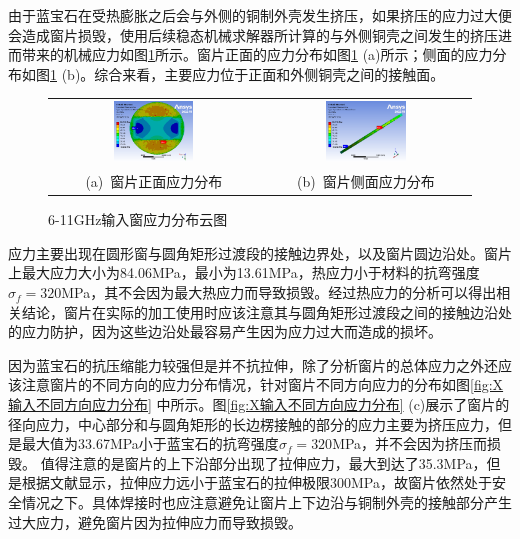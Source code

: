 \documentclass[master]{thesis-uestc}
\begin{document}
由于蓝宝石在受热膨胀之后会与外侧的铜制外壳发生挤压，如果挤压的应力过大便会造成窗片损毁，使用后续稳态机械求解器所计算的与外侧铜壳之间发生的挤压进而带来的机械应力如图\ref{fig:X输入应力分布}所示。窗片正面的应力分布如图\ref{fig:X输入应力分布} (a)所示；侧面的应力分布如图\ref{fig:X输入应力分布} (b)。综合来看，主要应力位于正面和外侧铜壳之间的接触面。
\begin{figure}[!htb]
    \small
    \centering
    \begin{tabular}{@{\ }c@{\ }c}
        \includegraphics[width=0.4\textwidth]{pic/chapter3/窗片正面应力分布.png} & 
        \hspace{5pt}
        \includegraphics[width=0.4\textwidth]{pic/chapter3/窗片侧面应力分布.png}     \\
        \mbox{\small (a) 窗片正面应力分布}                                                                               & 
        \mbox{\small (b) 窗片侧面应力分布}                                                                                  \\
    \end{tabular}
    \caption{6-11GHz输入窗应力分布云图}
    \label{fig:X输入应力分布}
\end{figure}

应力主要出现在圆形窗与圆角矩形过渡段的接触边界处，以及窗片圆边沿处。窗片上最大应力大小为84.06MPa，最小为13.61MPa，热应力小于材料的抗弯强度\(\sigma_f = 320\)MPa，其不会因为最大热应力而导致损毁。经过热应力的分析可以得出相关结论，窗片在实际的加工使用时应该注意其与圆角矩形过渡段之间的接触边沿处的应力防护，因为这些边沿处最容易产生因为应力过大而造成的损坏。

因为蓝宝石的抗压缩能力较强但是并不抗拉伸，除了分析窗片的总体应力之外还应该注意窗片的不同方向的应力分布情况，针对窗片不同方向应力的分布如图\ref{fig:X输入不同方向应力分布} 中所示。图\ref{fig:X输入不同方向应力分布} (c)展示了窗片的径向应力，中心部分和与圆角矩形的长边楞接触的部分的应力主要为挤压应力，但是最大值为33.67MPa小于蓝宝石的抗弯强度\(\sigma_f=320\)MPa，并不会因为挤压而损毁。
值得注意的是窗片的上下沿部分出现了拉伸应力，最大到达了35.3MPa，但是根据文献\cite{schmid1998effects}显示，拉伸应力远小于蓝宝石的拉伸极限300MPa，故窗片依然处于安全情况之下。具体焊接时也应注意避免让窗片上下边沿与铜制外壳的接触部分产生过大应力，避免窗片因为拉伸应力而导致损毁。
\end{document}
